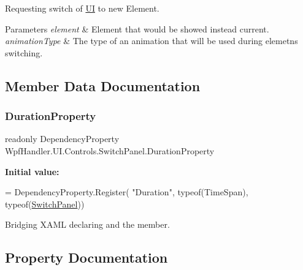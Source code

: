 Requesting switch of \mbox{\hyperlink{namespace_wpf_handler_1_1_u_i}{UI}} to new Element. 


\begin{DoxyParams}{Parameters}
{\em element} & Element that would be showed instead current.\\
\hline
{\em animation\+Type} & The type of an animation that will be used during elemetns switching.\\
\hline
\end{DoxyParams}


\subsection{Member Data Documentation}
\mbox{\label{class_wpf_handler_1_1_u_i_1_1_controls_1_1_switch_panel_ad636f8069ad5c1869073781451f6ba2a}} 
\subsubsection{\texorpdfstring{Duration\+Property}{DurationProperty}}
{\footnotesize\ttfamily readonly Dependency\+Property Wpf\+Handler.\+U\+I.\+Controls.\+Switch\+Panel.\+Duration\+Property\hspace{0.3cm}{\ttfamily [static]}}

{\bfseries Initial value\+:}
\begin{DoxyCode}
= DependencyProperty.Register(
          \textcolor{stringliteral}{"Duration"}, typeof(TimeSpan), typeof(\mbox{\hyperlink{class_wpf_handler_1_1_u_i_1_1_controls_1_1_switch_panel_a66b597d71d605434b2f51276feff9c8b}{SwitchPanel}}))
\end{DoxyCode}


Bridging X\+A\+ML declaring and the member. 



\subsection{Property Documentation}
\mbox{\label{class_wpf_handler_1_1_u_i_1_1_controls_1_1_switch_panel_a5412b80c31880fe852a7b82c0a81fd7a}} 

